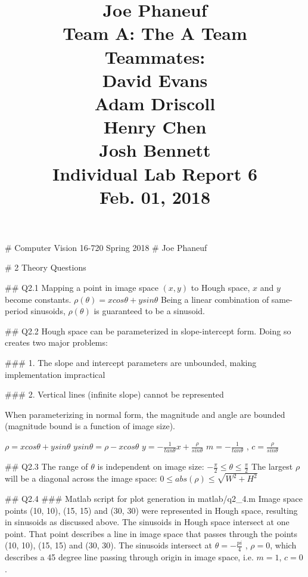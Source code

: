 \documentclass[12pt]{article}
\begin{document}
\title{Joe Phaneuf \\ Team A: The A Team \\ Teammates: \\ David Evans \\ Adam Driscoll \\ Henry Chen  \\ Josh Bennett \\ 
Individual Lab Report 6 \\ Feb. 01, 2018 }
\date{}
\author{}
\maketitle


# Computer Vision 16-720 Spring 2018
# Joe Phaneuf

# 2 Theory Questions  

## Q2.1  
Mapping a point in image space $(x,y)$ to Hough space, $x$ and $y$ become constants.  
$\rho(\theta) = x cos \theta + y sin \theta$  
Being a linear combination of same-period sinusoids, $\rho(\theta)$ is guaranteed to be a sinusoid.  

## Q2.2  
Hough space can be parameterized in slope-intercept form.  
Doing so creates two major problems:  

### 1. The slope and intercept parameters are unbounded, making implementation impractical

### 2. Vertical lines (infinite slope) cannot be represented  

When parameterizing in normal form, the magnitude and angle are bounded (magnitude bound is a function of image size).

$\rho = x cos \theta + y sin \theta$  
$y sin \theta = \rho - x cos \theta$  
$y = - \frac{1}{tan \theta} x + \frac{\rho}{sin \theta}$  
$m =- \frac{1}{tan \theta}$ , $c = \frac{\rho}{sin \theta}$  

## Q2.3  
The range of $\theta$ is independent on image size: $- \frac{\pi}{2} \leq \theta \leq \frac{\pi}{2}$  
The largest $\rho$ will be a diagonal across the image space: $0 \leq abs(\rho) \leq \sqrt{W^{2} + H^{2}}$

## Q2.4  
### Matlab script for plot generation in matlab/q2_4.m
Image space points (10, 10), (15, 15) and (30, 30) were represented in Hough space, resulting in sinusoids as discussed above. The sinusoids in Hough space intersect at one point. That point describes a line in image space that passes through the points (10, 10), (15, 15) and (30, 30). The sinusoids intersect at $\theta = - \frac{pi}{4}$ , $\rho = 0$, which describes a 45 degree line passing through origin in image space, i.e. $m=1$, $c=0$.
\end{document}
